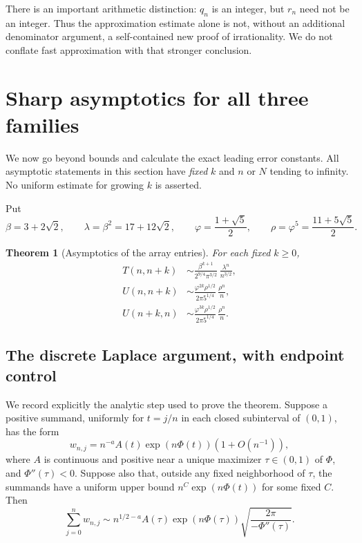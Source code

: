 \documentclass[11pt]{article}
\numberwithin{equation}{section}
\newtheorem{theorem}{Theorem}[section]
\theoremstyle{definition}
\theoremstyle{remark}
\begin{document}
There is an important arithmetic distinction: $q_n$ is an integer,
but $r_n$ need not be an integer. Thus the approximation estimate alone
is not, without an additional denominator argument, a self-contained
new proof of irrationality. We do not conflate fast approximation with
that stronger conclusion.

\section{Sharp asymptotics for all three families}\label{sec:asymptotics}

We now go beyond bounds and calculate the exact leading error constants.
All asymptotic statements in this section have \emph{fixed} $k$ and
$n$ or $N$ tending to infinity. No uniform estimate for growing $k$
is asserted.

Put
\begin{equation}\label{eq:constants}
 \beta=3+2\sqrt2,\qquad \lambda=\beta^2=17+12\sqrt2,
 \qquad \varphi=\frac{1+\sqrt5}{2},\qquad
 \rho=\varphi^5=\frac{11+5\sqrt5}{2}.
\end{equation}

\begin{theorem}[Asymptotics of the array entries]\label{thm:arrayasy}
For each fixed $k\geq0$,
\begin{align}
 T(n,n+k)&\sim
 \frac{\beta^{k+1}}{2^{9/4}\pi^{3/2}}\,
 \frac{\lambda^n}{n^{3/2}},\label{eq:Tasy}\\
 U(n,n+k)&\sim
 \frac{\varphi^{2k}\rho^{1/2}}{2\pi 5^{1/4}}\,
 \frac{\rho^n}{n},\label{eq:Upasy}\\
 U(n+k,n)&\sim
 \frac{\varphi^{3k}\rho^{1/2}}{2\pi 5^{1/4}}\,
 \frac{\rho^n}{n}.\label{eq:Umasy}
\end{align}
\end{theorem}

\subsection{The discrete Laplace argument, with endpoint control}
We record explicitly the analytic step used to prove the theorem.
Suppose a positive summand, uniformly for $t=j/n$ in each closed
subinterval of $(0,1)$, has the form
\[
 w_{n,j}=n^{-a}A(t)\exp(n\Phi(t))(1+O(n^{-1})),
\]
where $A$ is continuous and positive near a unique maximizer
$\tau\in(0,1)$ of $\Phi$, and $\Phi''(\tau)<0$.
Suppose also that, outside any fixed neighborhood of $\tau$, the
summands have a uniform upper bound
$n^C\exp(n\Phi(t))$ for some fixed $C$. Then
\begin{equation}\label{eq:laplace}
 \sum_{j=0}^n w_{n,j}\sim
 n^{1/2-a}A(\tau)\exp(n\Phi(\tau))
 \sqrt{\frac{2\pi}{-\Phi''(\tau)}}.
\end{equation}
\end{document}
